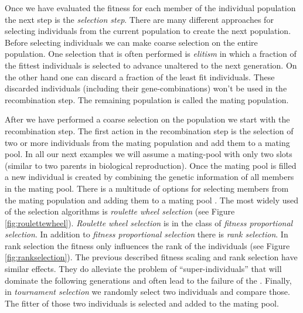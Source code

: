 Once we have evaluated the fitness for each member of the individual population the next step is the \textit{selection step}. There are many different approaches for selecting individuals from the current population to create the next population. Before selecting individuals we can make coarse selection on the entire population. One selection that is often performed is \textit{elitism} in which a fraction of the fittest individuals is selected to advance unaltered to the next generation. On the other hand one can discard a fraction of the least fit individuals. These discarded individuals (including their gene-combinations) won't be used in the recombination step. The remaining population is called the mating population.

After we have performed a coarse selection on the population we start with the recombination step. The first action in the recombination step is the selection of two or more individuals from the mating population and add them to a mating pool. In all our next examples we will assume a mating-pool with only two slots (similar to two parents in biological reproduction). Once the mating pool is filled a new individual is created by combining the genetic information of all members in the mating pool. There is a multitude of options for selecting members from the mating population and adding them to a mating pool \citep[for an overview see]{Goldberg91acomparative}. The most widely used of the selection algorithms is \textit{roulette wheel selection} (see Figure \ref{fig:roulettewheel}). \textit{Roulette wheel selection} is in the class of \textit{fitness proportional selection}. In addition to \textit{fitness proportional selection} there is \textit{rank selection}. In rank selection the fitness only influences the rank of the individuals (see Figure \ref{fig:rankselection}). The previous described fitness scaling and rank selection have similar effects. They do alleviate the problem of ``super-individuals'' that will dominate the following generations and often lead to the failure of the \ga. Finally, in \textit{tournament selection} we randomly select two individuals and compare those. The fitter of those two individuals is selected and added to the mating pool. 

